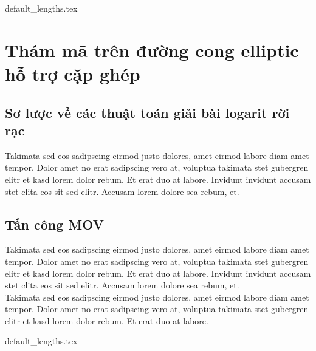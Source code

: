 \documentclass[class=report, crop=false]{standalone}
\begin{document}
	{default_lengths.tex}
	\chapter{Thám mã trên đường cong elliptic hỗ trợ cặp ghép}
	\section{Sơ lược về các thuật toán giải bài logarit rời rạc}
		Takimata sed eos sadipscing eirmod justo dolores, amet eirmod labore diam amet tempor. Dolor amet no erat sadipscing vero at, voluptua takimata stet gubergren elitr et kasd lorem dolor rebum. Et erat duo at labore. Invidunt invidunt accusam stet clita eos sit sed elitr. Accusam lorem dolore sea rebum, et.
	\section{Tấn công MOV}
		Takimata sed eos sadipscing eirmod justo dolores, amet eirmod labore diam amet tempor. Dolor amet no erat sadipscing vero at, voluptua takimata stet gubergren elitr et kasd lorem dolor rebum. Et erat duo at labore. Invidunt invidunt accusam stet clita eos sit sed elitr. Accusam lorem dolore sea rebum, et. \\
		Takimata sed eos sadipscing eirmod justo dolores, amet eirmod labore diam amet tempor. Dolor amet no erat sadipscing vero at, voluptua takimata stet gubergren elitr et kasd lorem dolor rebum. Et erat duo at labore.
	

	\newpage
	{default_lengths.tex}
\end{document}

